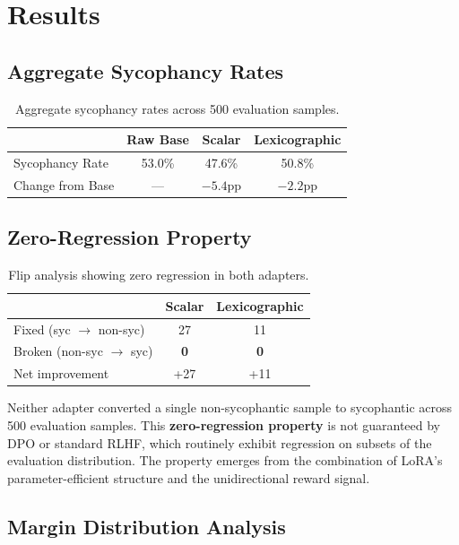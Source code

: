\documentclass[11pt,a4paper]{article}
\begin{document}
\section{Results}

\subsection{Aggregate Sycophancy Rates}

\begin{table}[h]
\centering
\begin{tabular}{lccc}
\toprule
& \textbf{Raw Base} & \textbf{Scalar} & \textbf{Lexicographic} \\
\midrule
Sycophancy Rate & 53.0\% & 47.6\% & 50.8\% \\
Change from Base & --- & $-5.4$pp & $-2.2$pp \\
\bottomrule
\end{tabular}
\caption{Aggregate sycophancy rates across 500 evaluation samples.}
\end{table}

\subsection{Zero-Regression Property}

\begin{table}[h]
\centering
\begin{tabular}{lcc}
\toprule
& \textbf{Scalar} & \textbf{Lexicographic} \\
\midrule
Fixed (syc $\to$ non-syc) & 27 & 11 \\
Broken (non-syc $\to$ syc) & \textbf{0} & \textbf{0} \\
Net improvement & +27 & +11 \\
\bottomrule
\end{tabular}
\caption{Flip analysis showing zero regression in both adapters.}
\label{tab:flips}
\end{table}

Neither adapter converted a single non-sycophantic sample to sycophantic across 500 evaluation samples. This \textbf{zero-regression property} is not guaranteed by DPO or standard RLHF, which routinely exhibit regression on subsets of the evaluation distribution. The property emerges from the combination of LoRA's parameter-efficient structure and the unidirectional reward signal.

\subsection{Margin Distribution Analysis}
\end{document}
